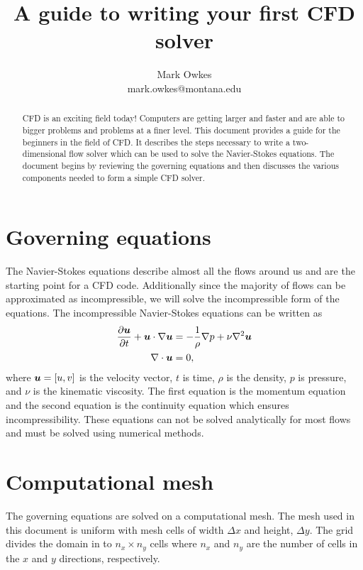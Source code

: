 \documentclass[]{article}
\title{A guide to writing your first CFD solver}
\author{Mark Owkes\\ mark.owkes@montana.edu}
\def\bm#1{\mbox{\boldmath{$#1$}}}
\begin{document}
\lstset{language=Matlab}

\maketitle

  \begin{abstract}
  CFD is an exciting field today!  Computers are getting larger and faster and are able to bigger problems and problems at a finer level.  This document provides a guide for the beginners in the field of CFD.  It describes the steps necessary to write a two-dimensional flow solver which can be used to solve the Navier-Stokes equations.  The document begins by reviewing the governing equations and then discusses the various components needed to form a simple CFD solver.
  \end{abstract}

  \tableofcontents
 
\section{Governing equations}
The Navier-Stokes equations describe almost all the flows around us and are the starting point for a CFD code. Additionally since the majority of flows can be approximated as incompressible, we will solve the incompressible form of the equations.  The incompressible Navier-Stokes equations can be written as
\begin{align}
  \frac{\partial \bm{u}}{\partial t} + \bm{u}\cdot\nabla\bm{u}&=-\frac{1}{\rho}\nabla p + \nu \nabla^2\bm{u}\\
  \nabla\cdot\bm{u}&=0,
\end{align}
where $\bm{u}=[u,v]$ is the velocity vector, $t$ is time, $\rho$ is the density, $p$ is pressure, and $\nu$ is the kinematic viscosity.  The first equation is the momentum equation and the second equation is the continuity equation which ensures incompressibility.  These equations can not be solved analytically for most flows and must be solved using numerical methods.

  
\section{Computational mesh}\label{sec:grid}
The governing equations are solved on a computational mesh.  The mesh used in this document is uniform with mesh cells of width $\Delta x$ and height, $\Delta y$.  The grid divides the domain in to $n_x\times n_y$ cells where $n_x$ and $n_y$ are the number of cells in the $x$ and $y$ directions, respectively.
\end{document}
